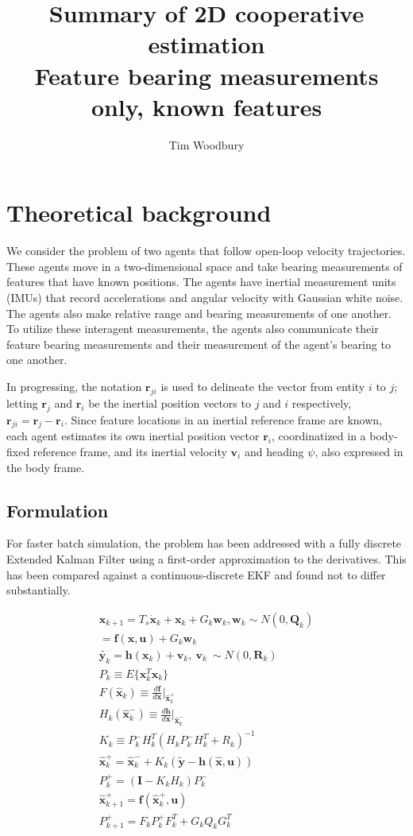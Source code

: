\documentclass{aiaa-tc}
\title{Summary of 2D cooperative estimation \\ \large{Feature bearing measurements only, known features}}
\author{Tim Woodbury}
\newcommand{\B}[1]{\textbf{#1}} %
\newcommand{\ddarg}[2]{\frac{d#1}{d#2}} %
\begin{document}
\maketitle

\section{Theoretical background}

We consider the problem of two agents that follow open-loop velocity trajectories. These agents move in a two-dimensional space and take bearing measurements of features that have known positions. The agents have inertial measurement units (IMUs) that record accelerations and angular velocity with Gaussian white noise. The agents also make relative range and bearing measurements of one another. To utilize these interagent measurements, the agents also communicate their feature bearing measurements and their measurement of the agent's bearing to one another.

In progressing, the notation $\B{r}_{ji}$ is used to delineate the vector from entity $i$ to $j$; letting $\B{r}_j$ and $\B{r}_i$ be the inertial position vectors to $j$ and $i$ respectively, $\B{r}_{ji} = \B{r}_j - \B{r}_i$. Since feature locations in an inertial reference frame are known, each agent estimates its own inertial position vector $\B{r}_i$, coordinatized in a body-fixed reference frame, and its inertial velocity $\B{v}_i$ and heading $\psi$, also expressed in the body frame. 

\subsection{Formulation}

For faster batch simulation, the problem has been addressed with a fully discrete Extended Kalman Filter using a first-order approximation to the derivatives. This has been compared against a continuous-discrete EKF and found not to differ substantially.

\begin{align}
\B{x}_{k+1} = T_s\dot{\B{x}}_k +\B{x}_k + G_k \B{w}_k, \B{w}_k \sim N(0,\B{Q}_k)  \\
 = \B{f}(\B{x},\B{u}) + G_k \B{w}_k\\
\tilde{\B{y}_k} = \B{h}(\B{x}_k) + \B{v}_k, \ \B{v}_k \ \sim N(0,\B{R}_k)\\
P_k \equiv E\{ \B{x}_k^T \B{x}_k \} \\
F(\hat{\B{x}}_k) \equiv \ddarg{\B{f}}{\B{x}} |_{\hat{\B{x}}_k^+} \\
H_k (\hat{\B{x}}_k^-) \equiv \ddarg{\B{h}}{\B{x}} |_{\hat{\B{x}}_k^-} \\
K_k \equiv P_k^-H_k^T(H_kP_k^-H_k^T + R_k)^{-1}\\
\hat{\B{x}}_k^+ = \hat{\B{x}}_k^- + K_k(\tilde{\B{y}} - \B{h}(\hat{\B{x}},\B{u}))\\
P_k^+ = (\B{I} - K_k H_k)P_k^-\\
\hat{\B{x}}_{k+1}^+ = \B{f}(\hat{\B{x}}_k^+,\B{u}) \\
P_{k+1}^+ = F_kP_k^+F_k^T + G_kQ_kG_k^T
\end{align}
\end{document}
